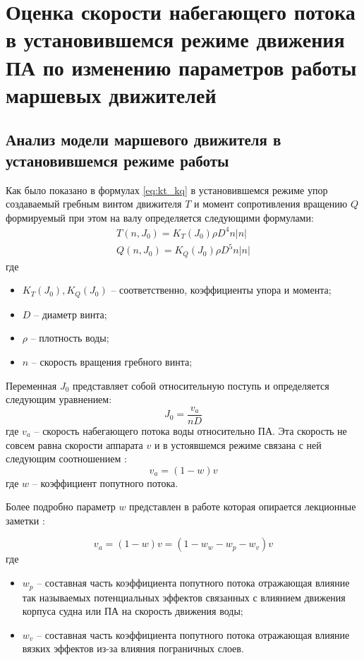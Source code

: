\chapter{Оценка скорости набегающего потока в установившемся режиме движения ПА по изменению параметров работы маршевых движителей}\label{ch:Velocity}

\section{Анализ модели маршевого движителя в установившемся режиме работы}
Как было показано в формулах \ref{eq:kt_kq} в установившемся режиме упор создаваемый гребным винтом движителя $T$ и момент сопротивления вращению $Q$ формируемый при этом на валу определяется следующими формулами:
\begin{gather*}
    T(n, J_0) = K_T (J_0) \rho D^4 n |n|\\
    Q(n, J_0) = K_Q (J_0) \rho D^5 n |n|
\end{gather*}
\noindent где
\begin{itemize}
    \item $K_T (J_0), K_Q (J_0)$ -- соответственно, коэффициенты упора и момента;
    \item $D$ -- диаметр винта;
    \item $\rho$ -- плотность воды;
    \item $n$ -- скорость вращения гребного винта;
\end{itemize}

Переменная $J_0$ представляет собой относительную поступь и определяется следующим уравнением:
\begin{equation*}
    \label{eq:ratio_1}
    J_0 = \frac{v_a}{nD}
\end{equation*}
\noindent где $v_a$ -- скорость набегающего потока воды относительно ПА.
Эта скорость не совсем равна скорости аппарата $v$ и в устоявшемся режиме связана с ней следующим соотношением \cite{lewis1988principles}:
\begin{equation*}
    v_a = (1-w)v
\end{equation*}
\noindent где $w$ -- коэффициент попутного потока.

Более подробно параметр $w$ представлен в работе \cite{10.1016/s1474-6670-17-46514-1} которая опирается лекционные заметки \cite{walderhaug1992motstand}:

\begin{equation*}
    v_a = (1-w)v = (1 - w_w - w_p - w_v)v
\end{equation*}
\noindent где
\begin{itemize}
    \item $w_p$ -- составная часть коэффициента попутного потока отражающая влияние так называемых потенциальных эффектов связанных с влиянием движения корпуса судна или ПА на скорость движения воды;
    \item $w_v$ -- составная часть коэффициента попутного потока отражающая влияние вязких эффектов из-за влияния пограничных слоев.
\end{itemize}

